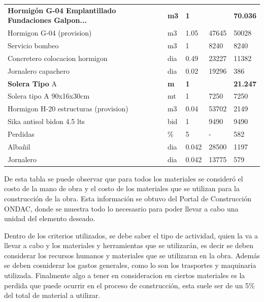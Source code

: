 \documentclass{article} %
\begin{document}
\begin{table}[H]
{\begin{tabular}{lllll}
    \textbf{Hormigón G-04 Emplantillado Fundaciones Galpon...} & \textbf{m3} & \textbf{1} & \textbf{} & \textbf{70.036} \\
                             Hormigon G-04 (provision) &     m3 &      1.05 &           47645 &        50028 \\
                                       Servicio bombeo &     m3 &         1 &            8240 &         8240 \\
                        Concretero colocacion hormigon &    dia &      0.49 &           23227 &        11382 \\
                                   Jornalero capachero &    dia &      0.02 &           19296 &          386 \\
                                   \textbf{Solera Tipo} A & \textbf{m} & \textbf{1} & \textbf{} & \textbf{21.247} \\
                              Solera tipo A 90x16x30cm &     mt &         1 &            7250 &         7250 \\
                 Hormigon H-20 estructuras (provision) &     m3 &      0.04 &           53702 &         2149 \\
                            Sika antisol bidon 4.5 lts &    bid &         1 &            9490 &         9490 \\
                                              Perdidas &      \% &         5 &               - &          582 \\
                                               Albañil &    dia &     0.042 &           28500 &         1197 \\
                                             Jornalero &    dia &     0.042 &           13775 &          579 \\
    \bottomrule
    \end{tabular}
    }
\end{table}


De esta tabla se puede observar que para todos los materiales se consideró el costo de la mano de obra y el costo de los materiales que se utilizan para la construcción de la obra. Esta información se obtuvo del Portal de Construcción ONDAC, donde se muestra todo lo necesasrio para poder llevar a cabo una unidad del elemento deseado.

Dentro de los criterios utilizados, se debe saber el tipo de actividad, quien la va a llevar a cabo y los materiales y herramientas que se utilizarán, es decir se deben considerar los recursos humanos y materiales que se utilizaran en la obra. Además se deben cosniderar los gastos generales, como lo son los trasportes y maquinaria utilizada. Finalmente algo a tener en consideracion en ciertos materiales es la perdida que puede ocurrir en el proceso de construcción, esta suele ser de un 5\% del total de material a utilizar.
\end{document}
